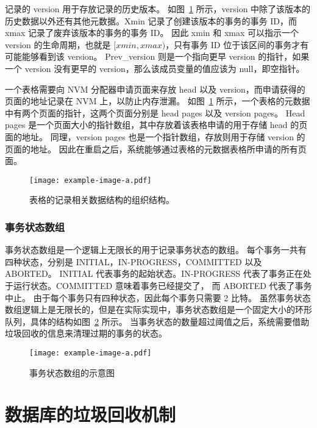 记录的 version 用于存放记录的历史版本。
如图~\ref{fig:table} 所示，version 中除了该版本的历史数据以外还有其他元数据。Xmin 记录了创建该版本的事务的事务 ID，而 xmax 记录了废弃该版本的事务的事务 ID。
因此 xmin 和 xmax 可以指示一个 version 的生命周期，也就是 $[xmin, xmax)$，只有事务 ID 位于该区间的事务才有可能能够看到该 version。
Prev\_version 则是一个指向更早 version 的指针，如果一个 version 没有更早的 version，那么该成员变量的值应该为 null，即空指针。

一个表格需要向 NVM 分配器申请页面来存放 head 以及 version，而申请获得的页面的地址记录在 NVM 上，以防止内存泄漏。
如图~\ref{fig:table} 所示，一个表格的元数据中有两个页面的指针，这两个页面分别是 head pages 以及 version pages。
Head pages 是一个页面大小的指针数组，其中存放着该表格申请的用于存储 head 的页面的地址。
同理，version pages 也是一个指针数组，存放则用于存储 version 的页面的地址。
因此在重启之后，系统能够通过表格的元数据表格所申请的所有页面。

\begin{figure}
    \centering
    \texttt{[image: example-image-a.pdf]}
    \caption{表格的记录相关数据结构的组织结构。}
    \label{fig:table}
\end{figure}

\subsubsection{事务状态数组}

事务状态数组是一个逻辑上无限长的用于记录事务状态的数组。
每个事务一共有四种状态，分别是 INITIAL，IN-PROGRESS，COMMITTED 以及 ABORTED。
INITIAL 代表事务的起始状态。IN-PROGRESS 代表了事务正在处于运行状态。COMMITTED 意味着事务已经提交了，
而 ABORTED 代表了事务中止。
由于每个事务只有四种状态，因此每个事务只需要 2 比特。
虽然事务状态数组逻辑上是无限长的，但是在实际实现中，事务状态数组是一个固定大小的环形队列，具体的结构如图~\ref{fig:clog} 所示。
当事务状态的数量超过阈值之后，系统需要借助垃圾回收的信息来清理过期的事务的状态。

\begin{figure}
    \centering
    \texttt{[image: example-image-a.pdf]}
    \caption{事务状态数组的示意图}
    \label{fig:clog}
\end{figure}




\section{数据库的垃圾回收机制}

